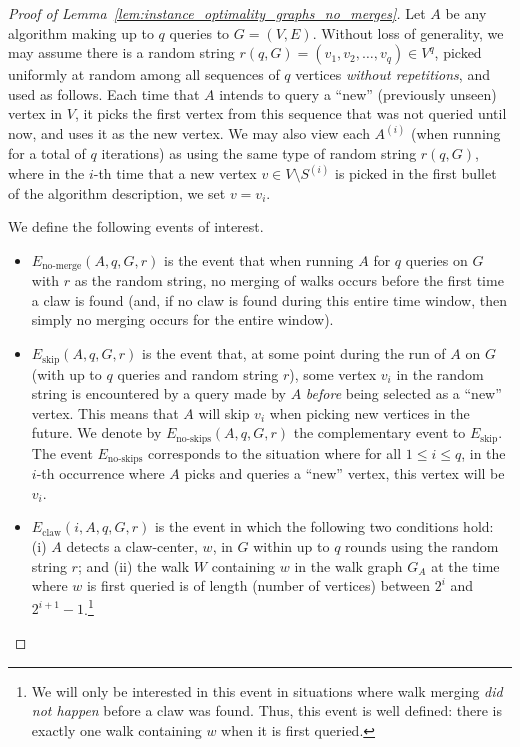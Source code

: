 \documentclass[11pt]{article}
\numberwithin{equation}{section}
\newcommand{\1}{\mathbf{1}}
\begin{document}
\begin{proof}[Proof of Lemma~\ref{lem:instance_optimality_graphs_no_merges}]
Let $A$ be any algorithm making up to $q$ queries to $G = (V,E)$. Without loss of generality, we may assume there is a random string $r(q,G) = (v_1, v_2, \ldots, v_q) \in V^q$, picked uniformly at random among all sequences of $q$ vertices \emph{without repetitions}, and used as follows. Each time that $A$ intends to query a ``new'' (previously unseen) vertex in $V$, it picks the first vertex from this sequence that was not queried until now, and uses it as the new vertex. We may also view each $A^{(i)}$ (when running for a total of $q$ iterations) as using the same type of random string $r(q,G)$, where in the $i$-th time that a new vertex $v \in V \setminus S^{(i)}$ is picked in the first bullet of the algorithm description, we set $v = v_i$.

We define the following events of interest.
\begin{itemize}
\item $E_{\text{no-merge}}(A, q, G, r)$ is the event that when running $A$ for $q$ queries on $G$ with $r$ as the random string, no merging of walks occurs before the first time a claw is found (and, if no claw is found during this entire time window, then simply no merging occurs for the entire window).
\item $E_{\text{skip}}(A,q,G,r)$ is the event that, at some point during the run of $A$ on $G$ (with up to $q$ queries and random string $r$), some vertex $v_i$ in the random string is encountered by a query made by $A$ \emph{before} being selected as a ``new'' vertex. This means that $A$ will skip $v_i$ when picking new vertices in the future. We denote by $E_{\text{no-skips}}(A,q,G,r)$ the complementary event to $E_{\text{skip}}$. The event $E_{\text{no-skips}}$ corresponds to the situation where for all $1 \leq i \leq q$, in the $i$-th occurrence where $A$ picks and queries a ``new'' vertex, this vertex will be $v_i$.
\item $E_{\text{claw}}(i, A, q, G, r)$ is the event in which the following two conditions hold: (i) $A$ detects a claw-center, $w$, in $G$ within up to $q$ rounds using the random string $r$; and (ii) the walk $W$ containing $w$ in the walk graph $G_A$ at the time where $w$ is first queried is of length (number of vertices) between $2^{i}$ and $2^{i+1}-1$.\footnote{We will only be interested in this event in situations where walk merging \emph{did not happen} before a claw was found. Thus, this event is well defined: there is exactly one walk containing $w$ when it is first queried.}
\end{itemize}


\end{proof}
\end{document}
